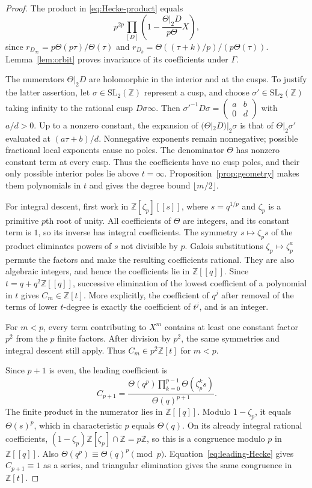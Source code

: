 \documentclass[11pt,a4paper]{article}
\theoremstyle{remark}
\newcommand{\Z}{\mathbb Z}\newcommand{\Q}{\mathbb Q}
\newcommand{\smat}[4]{\begin{pmatrix}#1&#2\\#3&#4\end{pmatrix}}
\begin{document}
\begin{proof}
The product in \eqref{eq:Hecke-product} equals
\[
 p^{2p}\prod_{[D]}\left(1-\frac{\Theta|_2D}{p\Theta}X\right),
\]
since $r_{D_\infty}=p\Theta(p\tau)/\Theta(\tau)$ and
$r_{D_k}=\Theta((\tau+k)/p)/(p\Theta(\tau))$.
Lemma~\ref{lem:orbit} proves invariance of its coefficients under $\Gamma$.

The numerators $\Theta|_2D$ are holomorphic in the interior and
at the cusps. To justify the latter assertion, let
$\sigma\in\mathrm{SL}_2(\Z)$ represent a cusp, and choose
$\sigma'\in\mathrm{SL}_2(\Z)$ taking infinity to
the rational cusp $D\sigma\infty$.
Then $\sigma'^{-1}D\sigma=\smat ab0d$ with $a/d>0$.
Up to a nonzero constant, the expansion of
$(\Theta|_2D)|_2\sigma$ is that of $\Theta|_2\sigma'$
evaluated at $(a\tau+b)/d$.
Nonnegative exponents remain nonnegative; possible fractional
local exponents cause no poles.
The denominator $\Theta$ has nonzero constant term at every cusp.
Thus the coefficients have no cusp poles, and their only possible
interior poles lie above $t=\infty$.
Proposition~\ref{prop:geometry} makes them polynomials in $t$
and gives the degree bound $\lfloor m/2\rfloor$.

For integral descent, first work in
$\Z[\zeta_p][[s]]$, where $s=q^{1/p}$ and $\zeta_p$ is a primitive
$p$th root of unity. All coefficients of $\Theta$ are integers,
and its constant term is $1$, so its inverse has integral coefficients.
The symmetry $s\mapsto\zeta_ps$ of the product eliminates powers
of $s$ not divisible by $p$. Galois substitutions
$\zeta_p\mapsto\zeta_p^a$ permute the factors and make the resulting
coefficients rational. They are also algebraic integers, and hence
the coefficients lie in $\Z[[q]]$.
Since $t=q+q^2\Z[[q]]$, successive elimination of the lowest
coefficient of a polynomial in $t$ gives $C_m\in\Z[t]$.
More explicitly, the coefficient of $q^j$ after removal of the
terms of lower $t$-degree is exactly the coefficient of $t^j$,
and is an integer.

For $m<p$, every term contributing to $X^m$ contains at least
one constant factor $p^2$ from the $p$ finite factors.
After division by $p^2$, the same symmetries and integral descent
still apply. Thus $C_m\in p^2\Z[t]$ for $m<p$.

Since $p+1$ is even, the leading coefficient is
\begin{equation}\label{eq:leading-Hecke}
 C_{p+1}=
 \frac{\Theta(q^p)\prod_{k=0}^{p-1}\Theta(\zeta_p^ks)}
      {\Theta(q)^{p+1}}.
\end{equation}
The finite product in the numerator lies in $\Z[[q]]$.
Modulo $1-\zeta_p$, it equals $\Theta(s)^p$, which in
characteristic $p$ equals $\Theta(q)$.
On its already integral rational coefficients,
$(1-\zeta_p)\Z[\zeta_p]\cap\Z=p\Z$, so this is a congruence
modulo $p$ in $\Z[[q]]$.
Also $\Theta(q^p)\equiv\Theta(q)^p\pmod p$.
Equation~\eqref{eq:leading-Hecke} gives $C_{p+1}\equiv1$ as a series,
and triangular elimination gives the same congruence in $\Z[t]$.
\end{proof}
\end{document}
